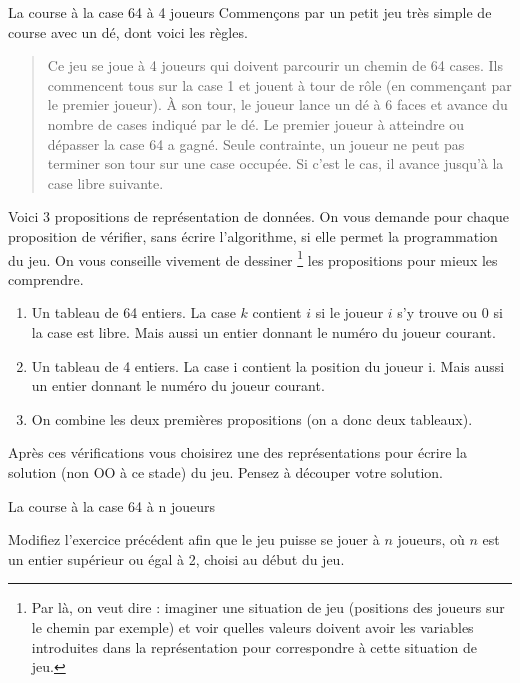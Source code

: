 \begin{Exercice}{La course à la case 64 à 4 joueurs}
	Commençons par un petit jeu très simple de course avec un dé, dont voici les règles.
	
	\begin{quote}
	\og Ce jeu se joue à 4 joueurs qui doivent parcourir un chemin de 64 cases.
	Ils commencent tous sur la case 1 et jouent à tour de rôle
	(en commençant par le premier joueur).
	À son tour, le joueur lance un dé à 6 faces 
	et avance du nombre de cases indiqué par le dé.
	Le premier joueur à atteindre ou dépasser la case 64 a gagné.
	Seule contrainte, un joueur ne peut pas terminer son tour
	sur une case occupée. 
	Si c'est le cas, il avance jusqu'à la case libre suivante.\fg
	\end{quote}
	
	Voici 3 propositions de représentation de données. 
	On vous demande pour chaque proposition de vérifier, 
	sans écrire l'algorithme, si elle permet la programmation du jeu. 
	On vous conseille vivement de \og{}dessiner\fg{}%
	\footnote{
		Par là, on veut dire : imaginer une situation de jeu
		(positions des joueurs sur le chemin par exemple)
		et voir quelles valeurs doivent avoir les variables
		introduites dans la représentation pour correspondre
		à cette situation de jeu. 
	} les propositions
	pour mieux les comprendre.
	
	\begin{enumerate}
	\item 
		Un tableau de 64 entiers.
		La case $k$ contient $i$ si le joueur $i$ s'y trouve 
		ou $0$ si la case est libre.
		Mais aussi un entier  donnant
		le numéro du joueur courant.
	\item
		Un tableau de 4 entiers. 
		La case i contient la position du joueur i.
		Mais aussi un entier  donnant
		le numéro du joueur courant.
	\item
		On combine les deux premières propositions
		(on a donc deux tableaux).
	\end{enumerate}

	Après ces vérifications vous choisirez une des représentations 
	pour écrire la solution (non OO à ce stade) du jeu.
	Pensez à découper votre solution.
	
\end{Exercice}

\begin{Exercice}{La course à la case 64 à n joueurs}

	Modifiez l'exercice précédent 
	afin que le jeu puisse se jouer à $n$ joueurs,
	où $n$ est un entier supérieur ou égal à 2, choisi au début du jeu.

\end{Exercice}
	
